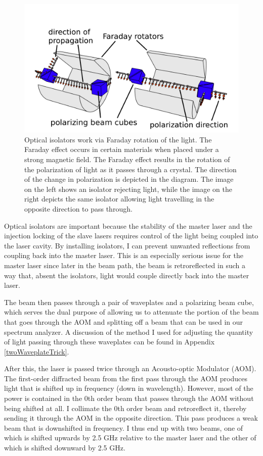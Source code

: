 \begin{figure}
\centerline{\includegraphics[width=1\textwidth]{isolators}}
\caption[Optical isolator illustration]{\label{isolatorPicture} Optical isolators work via Faraday rotation of the light. The Faraday effect occurs in certain materials when placed under a strong magnetic field. The Faraday effect results in the rotation of the polarization of light as it passes through a crystal. The direction of the change in polarization is depicted in the diagram. The image on the left shows an isolator rejecting light, while the image on the right depicts the same isolator allowing light travelling in the opposite direction to pass through.}
\end{figure}

Optical isolators are important because the stability of the master laser and the injection locking of the slave lasers requires control of the light being coupled into the laser cavity. By installing isolators, I can prevent unwanted reflections from coupling back into the master laser. This is an especially serious issue for the master laser since later in the beam path, the beam is retroreflected in such a way that, absent the isolators, light would couple directly back into the master laser. 

The beam then passes through a pair of waveplates and a polarizing beam cube, which serves the dual purpose of allowing us to attenuate the portion of the beam that goes through the AOM and splitting off a beam that can be used in our spectrum analyzer. A discussion of the method I used for adjusting the quantity of light passing through these waveplates can be found in Appendix \ref{twoWaveplateTrick}.

After this, the laser is passed twice through an Acousto-optic Modulator (AOM). The first-order diffracted beam from the first pass through the AOM produces light that is shifted up in frequency (down in wavelength). However, most of the power is contained in the 0th order beam that passes through the AOM without being shifted at all. I collimate the 0th order beam and retroreflect it, thereby sending it through the AOM in the opposite direction. This pass produces a weak beam that is downshifted in frequency. I thus end up with two beams, one of which is shifted upwards by 2.5 GHz relative to the master laser and the other of which is shifted downward by 2.5 GHz. 

